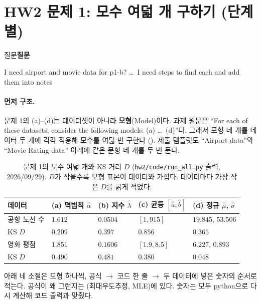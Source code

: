 \documentclass[11pt]{article}
\newenvironment{callout}[1][]
  {\par\medskip\noindent
   \begin{lrbox}{\calloutbox}\begin{minipage}{0.92\linewidth}
   \def\calloutttl{#1}\ifx\calloutttl\empty\else\textbf{#1}\par\smallskip\fi}
  {\end{minipage}\end{lrbox}%
   \fcolorbox{black!30}{black!3}{\usebox{\calloutbox}}\par\medskip}
\newcommand{\term}[1]{\textbf{#1}}
\begin{document}
\section{HW2 문제 1: 모수 여덟 개 구하기 (단계별)}
\label{sec:p1-steps}

\begin{callout}[질문]
I need airport and movie data for p1-b? \dots\ I need steps to find each and add them into notes
\end{callout}

\paragraph{먼저 구조.} 문제 1의 (a)--(d)는 데이터셋이 아니라 \term{모형}(Model)이다.
과제 원문은 ``For each of these datasets, consider the following models: (a) \dots\ (d)''다.
그래서 모형 네 개를 데이터 두 개에 각각 적용해 모수를 여덟 번 구한다
(). 제출 템플릿도 ``Airport data''와 ``Movie Rating data'' 아래에 같은
문항 네 개를 두 번 둔다.

\begin{table}[H]
  \centering
  \caption{문제 1의 모수 여덟 개와 KS 거리 $D$ (\texttt{hw2/code/run\_all.py} 출력, 2026/09/29).
    $D$가 작을수록 모형 표본이 데이터와 가깝다. 데이터마다 가장 작은 $D$를 굵게 적었다.}
  \label{tab:p1-eight}
  \begin{tabular}{lllll}
    \toprule
    데이터 & (a) 멱법칙 $\hat\alpha$ & (b) 지수 $\hat\lambda$ & (c) 균등 $[\hat a, \hat b]$ & (d) 정규 $\hat\mu$, $\hat\sigma$ \\
    \midrule
    공항 노선 수 & $1.612$ & $0.0504$ & $[1, 915]$ & $19.845$, $53.506$ \\
    \quad KS $D$ & $\mathbf{0.209}$ & $0.397$ & $0.856$ & $0.365$ \\
    \midrule
    영화 평점 & $1.851$ & $0.1606$ & $[1.9, 8.5]$ & $6.227$, $0.893$ \\
    \quad KS $D$ & $0.490$ & $0.481$ & $0.380$ & $\mathbf{0.048}$ \\
    \bottomrule
  \end{tabular}
\end{table}

아래 네 소절은 모형 하나씩, 공식 $\to$ 코드 한 줄 $\to$ 두 데이터에 넣은 숫자의 순서로 적는다.
공식이 왜 그런지는 (최대우도추정, MLE)에 있다. 숫자는 모두 python으로
다시 계산해 코드 출력과 맞췄다.
\end{document}
